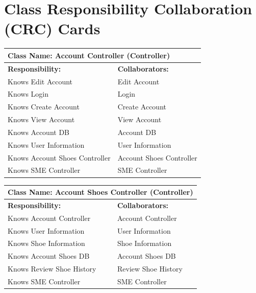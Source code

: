 \documentclass[]{article}
\begin{document}
\section{Class Responsibility Collaboration (CRC) Cards}
\label{sec:class_responsibility_collaboration_crc_cards}
\begin{table}[H]
    \centering
    \begin{tabular}{|p{}|p{}|}
        \hline
        \multicolumn{2}{|l|}{\textbf{Class Name:} Account Controller (Controller)} \\
        \hline
        \textbf{Responsibility:} & \textbf{Collaborators:} \\
        \hline
        Knows Edit Account & Edit Account \\
        Knows Login & Login \\
        Knows Create Account  & Create Account\\
        Knows View Account  & View Account \\
        Knows Account DB  & Account DB \\
        Knows User Information  & User Information \\
        Knows Account Shoes Controller & Account Shoes Controller \\
        Knows SME Controller & SME Controller \\
        \hline
    \end{tabular}
    \label{tab:account_controller}
\end{table}

\begin{table}[H]
    \centering
    \begin{tabular}{|p{}|p{}|}
        \hline
        \multicolumn{2}{|l|}{\textbf{Class Name:} Account Shoes Controller (Controller)} \\
        \hline
        \textbf{Responsibility:} & \textbf{Collaborators:} \\
        \hline
        Knows Account Controller & Account Controller \\
        Knows User Information & User Information \\
        Knows Shoe Information & Shoe Information \\
        Knows Account Shoes DB & Account Shoes DB \\
        Knows Review Shoe History & Review Shoe History \\
        Knows SME Controller & SME Controller \\
        \hline
    \end{tabular}
    \label{tab:account_shoes_controller}
\end{table}
\end{document}

